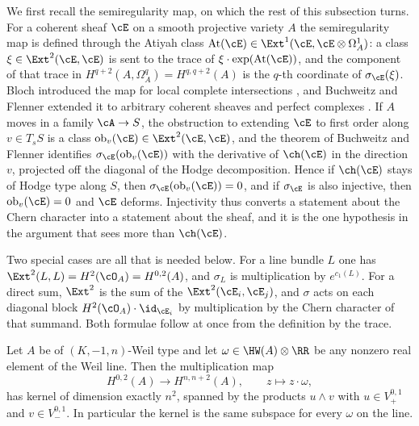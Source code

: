 We first recall the semiregularity map, on which the rest of this subsection
turns. For a coherent sheaf $\cE$ on a smooth projective variety $A$ the semiregularity
map is defined through the Atiyah class
$\mathrm{At}(\cE)\in\Ext^{1}(\cE,\cE\otimes\Omega^{1}_{A})$: a class
$\xi\in\Ext^{2}(\cE,\cE)$ is sent to the trace of
$\xi\cdot\exp(\mathrm{At}(\cE))$, and the component of that trace in
$H^{q+2}(A,\Omega^{q}_{A})=H^{q,q+2}(A)$ is the $q$-th coordinate of
$\sigma_{\cE}(\xi)$. Bloch introduced the map for local complete
intersections \cite{Blo72}, and Buchweitz and Flenner extended it to
arbitrary coherent sheaves and perfect complexes \cite{BF03}. If $A$ moves in
a family $\cA\to S$, the obstruction to extending $\cE$ to first order along
$v\in T_{s}S$ is a class $\mathrm{ob}_{v}(\cE)\in\Ext^{2}(\cE,\cE)$, and the
theorem of Buchweitz and Flenner identifies $\sigma_{\cE}(\mathrm{ob}_{v}(\cE))$
with the derivative of $\ch(\cE)$ in the direction $v$, projected off the
diagonal of the Hodge decomposition. Hence if $\ch(\cE)$ stays of Hodge type
along $S$, then $\sigma_{\cE}(\mathrm{ob}_{v}(\cE))=0$, and if $\sigma_{\cE}$ is
also injective, then $\mathrm{ob}_{v}(\cE)=0$ and $\cE$ deforms.
Injectivity thus converts a statement about the Chern character into a
statement about the sheaf, and it is the one hypothesis in the argument that
sees more than $\ch(\cE)$.

Two special cases are all that is needed below. For a line bundle $L$ one has
$\Ext^{2}(L,L)=H^{2}(\cO_{A})=H^{0,2}(A)$, and $\sigma_{L}$ is multiplication
by $e^{c_{1}(L)}$. For a direct sum, $\Ext^{2}$ is the sum of the
$\Ext^{2}(\cE_{i},\cE_{j})$, and $\sigma$ acts on each diagonal block
$H^{2}(\cO_{A})\cdot\id_{\cE_{i}}$ by multiplication by the Chern character of
that summand. Both formulae follow at once from the definition by the trace.

\begin{lemma}
\label{lem:annihilator}
Let $A$ be of $(K,-1,n)$-Weil type and let $\omega\in\HW(A)\otimes\RR$ be
any nonzero real element of the Weil line. Then the multiplication map
\[
  H^{0,2}(A)\longrightarrow H^{n,n+2}(A),\qquad z\longmapsto z\cdot\omega,
\]
has kernel of dimension exactly $n^{2}$, spanned by the products $u\wedge v$
with $u\in V_{+}^{0,1}$ and $v\in V_{-}^{0,1}$. In particular the kernel is
the same subspace for every $\omega$ on the line.
\end{lemma}

